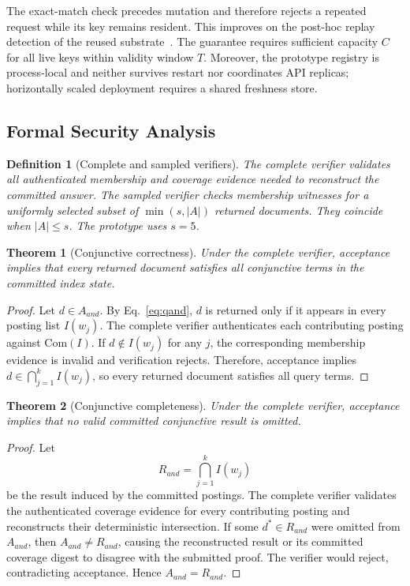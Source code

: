 \documentclass[journal]{IEEEtran}
\theoremstyle{tight}
\newtheorem{definition}{Definition}
\newtheorem{theorem}{Theorem}
\theoremstyle{remark}
\theoremstyle{plain}
\begin{document}
The exact-match check precedes mutation and therefore rejects a repeated request while its key remains resident. This improves on the post-hoc replay detection of the reused substrate~\cite{Nnadiekwe2026PureSearchHCC}. The guarantee requires sufficient capacity \(C\) for all live keys within validity window \(T\). Moreover, the prototype registry is process-local and neither survives restart nor coordinates API replicas; horizontally scaled deployment requires a shared freshness store.

\subsection{Formal Security Analysis}
\label{3E}

\begin{definition}[Complete and sampled verifiers]
\label{def:completeverifier}
The complete verifier validates all authenticated membership and coverage evidence needed to reconstruct the committed answer. The sampled verifier checks membership witnesses for a uniformly selected subset of \(\min(s,|A|)\) returned documents. They coincide when \(|A|\leq s\). The prototype uses \(s=5\).
\end{definition}

\begin{theorem}[Conjunctive correctness]
\label{thm:conjcorrect}
Under the complete verifier, acceptance implies that every returned document satisfies all conjunctive terms in the committed index state.
\end{theorem}

\begin{proof}
Let \(d\in A_{and}\). By Eq.~\eqref{eq:qand}, \(d\) is returned only if it appears in every posting list \(I(w_j)\). The complete verifier authenticates each contributing posting against \(\mathrm{Com}(I)\). If \(d\notin I(w_j)\) for any \(j\), the corresponding membership evidence is invalid and verification rejects. Therefore, acceptance implies \(d\in\bigcap_{j=1}^{k}I(w_j)\), so every returned document satisfies all query terms.
\end{proof}

\begin{theorem}[Conjunctive completeness]
\label{thm:conjcomplete}
Under the complete verifier, acceptance implies that no valid committed conjunctive result is omitted.
\end{theorem}

\begin{proof}
Let
\[
R_{and}=\bigcap_{j=1}^{k}I(w_j)
\]
be the result induced by the committed postings. The complete verifier validates the authenticated coverage evidence for every contributing posting and reconstructs their deterministic intersection. If some \(d^{*}\in R_{and}\) were omitted from \(A_{and}\), then \(A_{and}\neq R_{and}\), causing the reconstructed result or its committed coverage digest to disagree with the submitted proof. The verifier would reject, contradicting acceptance. Hence \(A_{and}=R_{and}\).
\end{proof}
\end{document}
